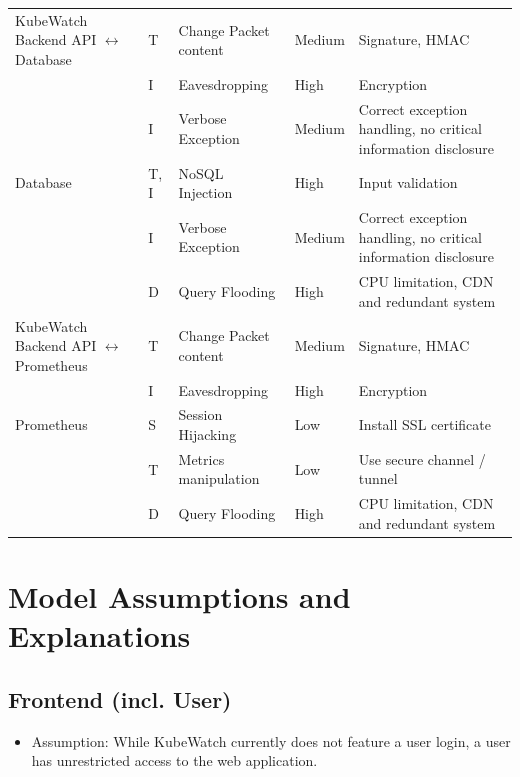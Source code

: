 \begin{longtable}[h!]{p{2.1cm} | p{1.8cm} | p{3cm} | p{2cm} | p{3.5cm}}
    \hline
    KubeWatch Backend API \(\leftrightarrow\) Database
                        & T & Change Packet content & Medium & Signature, HMAC \\
                        & I & Eavesdropping & High & Encryption \\
                        & I & Verbose Exception & Medium & Correct exception handling, no critical information disclosure \\
    \hline
    Database            & T, I & NoSQL Injection & High & Input validation \\
                        & I & Verbose Exception & Medium & Correct exception handling, no critical information disclosure \\
                        & D & Query Flooding & High & CPU limitation, CDN and redundant system \\
    \hline
    KubeWatch Backend API \(\leftrightarrow\) Prometheus
                        & T & Change Packet content & Medium & Signature, HMAC \\
                        & I & Eavesdropping & High & Encryption \\
    \hline
    Prometheus          & S & Session Hijacking & Low & Install SSL certificate \\
                        & T & Metrics manipulation & Low & Use secure channel / tunnel \\
                        & D & Query Flooding & High & CPU limitation, CDN and redundant system \\
    \hline
\end{longtable}


\section{Model Assumptions and Explanations}

\subsection{Frontend (incl. User)}
\begin{itemize}
    \item Assumption: While KubeWatch currently does not feature a user login, a user has unrestricted access to the web application.
\end{itemize}


